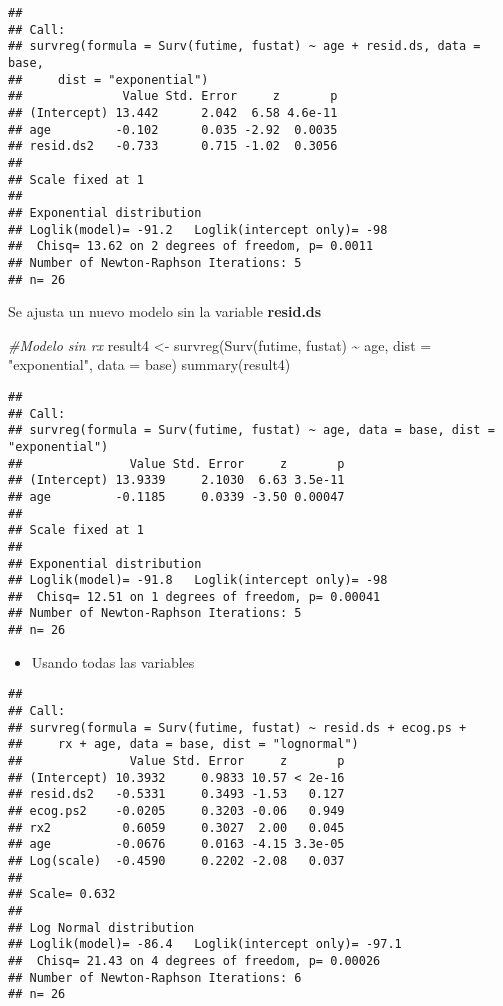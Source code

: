 \documentclass[
]{article}
\newenvironment{Shaded}{\begin{snugshade}}{\end{snugshade}}
\newcommand{\AttributeTok}[1]{\textcolor[rgb]{0.77,0.63,0.00}{#1}}
\newcommand{\CommentTok}[1]{\textcolor[rgb]{0.56,0.35,0.01}{\textit{#1}}}
\newcommand{\FunctionTok}[1]{\textcolor[rgb]{0.00,0.00,0.00}{#1}}
\newcommand{\NormalTok}[1]{#1}
\newcommand{\OtherTok}[1]{\textcolor[rgb]{0.56,0.35,0.01}{#1}}
\newcommand{\SpecialCharTok}[1]{\textcolor[rgb]{0.00,0.00,0.00}{#1}}
\newcommand{\StringTok}[1]{\textcolor[rgb]{0.31,0.60,0.02}{#1}}
\providecommand{\tightlist}{%
  \setlength{\itemsep}{0pt}\setlength{\parskip}{0pt}}
\begin{document}
\begin{verbatim}
## 
## Call:
## survreg(formula = Surv(futime, fustat) ~ age + resid.ds, data = base, 
##     dist = "exponential")
##              Value Std. Error     z       p
## (Intercept) 13.442      2.042  6.58 4.6e-11
## age         -0.102      0.035 -2.92  0.0035
## resid.ds2   -0.733      0.715 -1.02  0.3056
## 
## Scale fixed at 1 
## 
## Exponential distribution
## Loglik(model)= -91.2   Loglik(intercept only)= -98
##  Chisq= 13.62 on 2 degrees of freedom, p= 0.0011 
## Number of Newton-Raphson Iterations: 5 
## n= 26
\end{verbatim}

Se ajusta un nuevo modelo sin la variable \textbf{resid.ds}

\begin{Shaded}
\begin{Highlighting}[]
\CommentTok{\#Modelo sin rx}
\NormalTok{result4 }\OtherTok{\textless{}{-}} \FunctionTok{survreg}\NormalTok{(}\FunctionTok{Surv}\NormalTok{(futime, fustat) }\SpecialCharTok{\textasciitilde{}}\NormalTok{ age, }\AttributeTok{dist =} \StringTok{"exponential"}\NormalTok{, }\AttributeTok{data =}\NormalTok{ base)}
\FunctionTok{summary}\NormalTok{(result4)}
\end{Highlighting}
\end{Shaded}

\begin{verbatim}
## 
## Call:
## survreg(formula = Surv(futime, fustat) ~ age, data = base, dist = "exponential")
##               Value Std. Error     z       p
## (Intercept) 13.9339     2.1030  6.63 3.5e-11
## age         -0.1185     0.0339 -3.50 0.00047
## 
## Scale fixed at 1 
## 
## Exponential distribution
## Loglik(model)= -91.8   Loglik(intercept only)= -98
##  Chisq= 12.51 on 1 degrees of freedom, p= 0.00041 
## Number of Newton-Raphson Iterations: 5 
## n= 26
\end{verbatim}


\begin{itemize}
\tightlist
\item
  Usando todas las variables
\end{itemize}

\begin{verbatim}
## 
## Call:
## survreg(formula = Surv(futime, fustat) ~ resid.ds + ecog.ps + 
##     rx + age, data = base, dist = "lognormal")
##               Value Std. Error     z       p
## (Intercept) 10.3932     0.9833 10.57 < 2e-16
## resid.ds2   -0.5331     0.3493 -1.53   0.127
## ecog.ps2    -0.0205     0.3203 -0.06   0.949
## rx2          0.6059     0.3027  2.00   0.045
## age         -0.0676     0.0163 -4.15 3.3e-05
## Log(scale)  -0.4590     0.2202 -2.08   0.037
## 
## Scale= 0.632 
## 
## Log Normal distribution
## Loglik(model)= -86.4   Loglik(intercept only)= -97.1
##  Chisq= 21.43 on 4 degrees of freedom, p= 0.00026 
## Number of Newton-Raphson Iterations: 6 
## n= 26
\end{verbatim}
\end{document}
